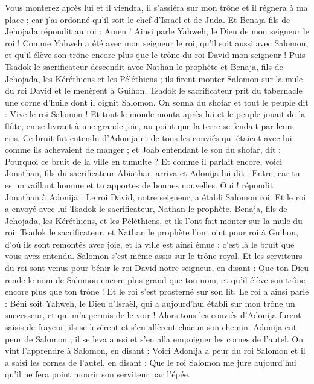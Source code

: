 \begin{multicols}{2}
Vous monterez après lui et il viendra, il s'assiéra sur mon trône et il régnera à ma place ; car j'ai ordonné qu'il soit le chef d'Israël et de Juda.
Et Benaja fils de Jehojada répondit au roi : Amen ! Ainsi parle Yahweh, le Dieu de mon seigneur le roi !
Comme Yahweh a été avec mon seigneur le roi, qu'il soit aussi avec Salomon, et qu'il élève son trône encore plus que le trône du roi David mon seigneur !
Puis Tsadok le sacrificateur descendit avec Nathan le prophète et Benaja, fils de Jehojada, les Kéréthiens et les Péléthiens ; ils firent monter Salomon sur la mule du roi David et le menèrent à Guihon.
Tsadok le sacrificateur prit du tabernacle une corne d'huile dont il oignit Salomon. On sonna du shofar et tout le peuple dit : Vive le roi Salomon !
Et tout le monde monta après lui et le peuple jouait de la flûte, en se livrant à une grande joie, au point que la terre se fendait par leurs cris.
Ce bruit fut entendu d’Adonija et de tous les conviés qui étaient avec lui comme ils achevaient de manger ; et Joab entendant le son du shofar, dit : Pourquoi ce bruit de la ville en tumulte ?
Et comme il parlait encore, voici Jonathan, fils du sacrificateur Abiathar, arriva et Adonija lui dit : Entre, car tu es un vaillant homme et tu apportes de bonnes nouvelles.
Oui ! répondit Jonathan à Adonija : Le roi David, notre seigneur, a établi Salomon roi.
Et le roi a envoyé avec lui Tsadok le sacrificateur, Nathan le prophète, Benaja, fils de Jehojada, les Kéréthiens, et les Péléthiens, et ils l'ont fait monter sur la mule du roi.
Tsadok le sacrificateur, et Nathan le prophète l'ont oint pour roi à Guihon, d'où ils sont remontés avec joie, et la ville est ainsi émue ; c'est là le bruit que vous avez entendu.
Salomon s'est même assis sur le trône royal.
Et les serviteurs du roi sont venus pour bénir le roi David notre seigneur, en disant : Que ton Dieu rende le nom de Salomon encore plus grand que ton nom, et qu'il élève son trône encore plus que ton trône ! Et le roi s'est prosterné sur son lit.
Le roi a ainsi parlé : Béni soit Yahweh, le Dieu d'Israël, qui a aujourd’hui établi sur mon trône un successeur, et qui m’a permis de le voir !
Alors tous les conviés d’Adonija furent saisis de frayeur, ils se levèrent et s'en allèrent chacun son chemin.
Adonija eut peur de Salomon ; il se leva aussi et s'en alla empoigner les cornes de l'autel.
On vint l’apprendre à Salomon, en disant : Voici Adonija a peur du roi Salomon et il a saisi les cornes de l'autel, en disant : Que le roi Salomon me jure aujourd'hui qu'il ne fera point mourir son serviteur par l'épée.

\end{multicols}

